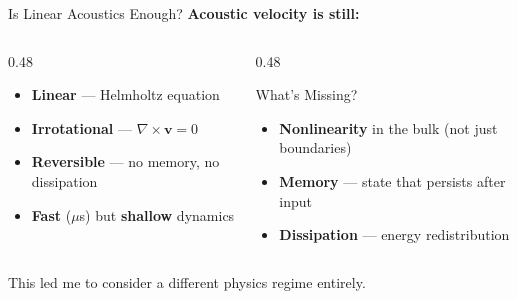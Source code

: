 \documentclass[aspectratio=169,11pt]{beamer}
\begin{document}
\begin{frame}{Is Linear Acoustics Enough?}
  \textbf{Acoustic velocity is still:}

  \vspace{0.2cm}
  \begin{columns}[T]
    \begin{column}{0.48\textwidth}
      \begin{itemize}
        \item \textbf{Linear} --- Helmholtz equation
        \item \textbf{Irrotational} --- $\nabla \times \mathbf{v} = 0$
        \item \textbf{Reversible} --- no memory, no dissipation
        \item \textbf{Fast} ($\mu$s) but \textbf{shallow} dynamics
      \end{itemize}
    \end{column}
    \begin{column}{0.48\textwidth}
      \begin{block}{\footnotesize What's Missing?}
        \footnotesize
        \begin{itemize}
          \item \textbf{Nonlinearity} in the bulk (not just boundaries)
          \item \textbf{Memory} --- state that persists after input
          \item \textbf{Dissipation} --- energy redistribution
        \end{itemize}
      \end{block}
    \end{column}
  \end{columns}

  \vspace{0.4cm}
  \begin{center}
    \textcolor{gdpDarkBlue}{\large This led me to consider a different physics regime entirely.}
  \end{center}
\end{frame}
\end{document}
